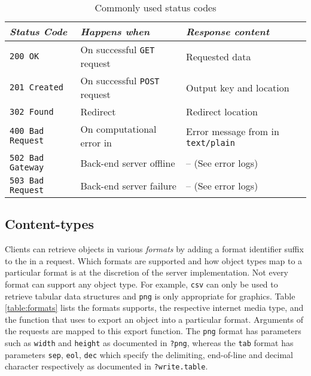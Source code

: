 \begin{table}[H]
\centering
\def\arraystretch{1.3}%
\begin{tabular}{@{}lll@{}}
\toprule
\emph{Status Code}              & \emph{Happens when}                             & \emph{Response content}                     \\ \midrule
\texttt{200 OK}          & On successful \texttt{GET} request                     & Requested data                    \\
\texttt{201 Created}     & On successful \texttt{POST} request                    & Output key and location                     \\
\texttt{302 Found}       & Redirect                                               & Redirect location                   \\
\texttt{400 Bad Request} & On computational error in \R                                     & Error message from \R in \texttt{text/plain} \\
\texttt{502 Bad Gateway} & Back-end server offline                            & -- (See error logs) \\
\texttt{503 Bad Request} & Back-end server failure                                & -- (See error logs) \\ \bottomrule                          
\end{tabular}
\caption{Commonly used \HTTP status codes}
\label{table:statuscodes}
\end{table}

\subsection{Content-types}

Clients can retrieve objects in various \emph{formats} by adding a format identifier suffix to the \URL in a \GET request. Which formats are supported and how object types map to a particular format is at the discretion of the server implementation. Not every format can support any object type. For example, \texttt{csv} can only be used to retrieve tabular data structures and \texttt{png} is only appropriate for graphics. Table \ref{table:formats} lists the formats \OpenCPU supports, the respective internet media type, and the \R function that \OpenCPU uses to export an object into a particular format. Arguments of the \GET requests are mapped to this export function. The \texttt{png} format has parameters such as \texttt{width} and \texttt{height} as documented in \texttt{?png}, whereas the \texttt{tab} format has parameters \texttt{sep}, \texttt{eol}, \texttt{dec} which specify the delimiting, end-of-line and decimal character respectively as documented in \texttt{?write.table}.

